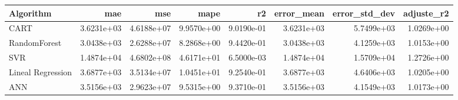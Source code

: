 \begin{tabular}{lrrrrrrr}
\toprule
Algorithm & mae & mse & mape & r2 & error_mean & error_std_dev & adjuste_r2 \\
\midrule
CART & 3.6231e+03 & 4.6188e+07 & 9.9570e+00 & 9.0190e-01 & 3.6231e+03 & 5.7499e+03 & 1.0269e+00 \\
RandomForest & 3.0438e+03 & 2.6288e+07 & 8.2868e+00 & 9.4420e-01 & 3.0438e+03 & 4.1259e+03 & 1.0153e+00 \\
SVR & 1.4874e+04 & 4.6802e+08 & 4.6171e+01 & 6.5000e-03 & 1.4874e+04 & 1.5709e+04 & 1.2726e+00 \\
Lineal Regression & 3.6877e+03 & 3.5134e+07 & 1.0451e+01 & 9.2540e-01 & 3.6877e+03 & 4.6406e+03 & 1.0205e+00 \\
ANN & 3.5156e+03 & 2.9623e+07 & 9.5315e+00 & 9.3710e-01 & 3.5156e+03 & 4.1549e+03 & 1.0173e+00 \\
\bottomrule
\end{tabular}
